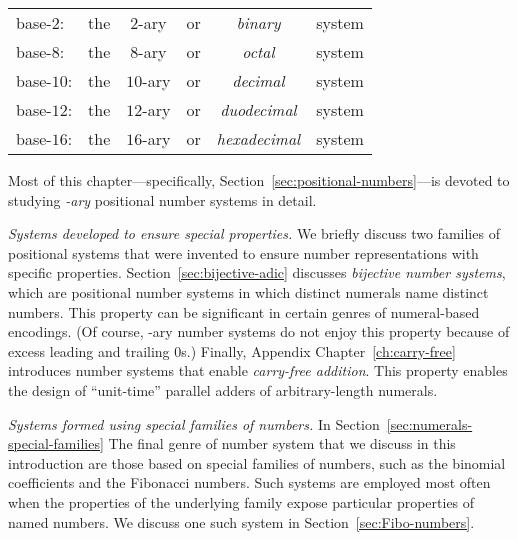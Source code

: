 \smallskip

\begin{tabular}{llclcl}
base-$2$:  & the & $2$-ary  & or & {\em binary}      & system \\
base-$8$:  & the & $8$-ary  & or & {\em octal}       & system \\
base-$10$: & the & $10$-ary & or & {\em decimal}     & system \\
base-$12$: & the & $12$-ary & or & {\em duodecimal}  & system \\
base-$16$: & the & $16$-ary & or & {\em hexadecimal} & system
\end{tabular}

\smallskip

\noindent
Most of this chapter---specifically,
Section~\ref{sec:positional-numbers}---is devoted to studying {\em
  -ary} positional number systems in detail.

\medskip

\noindent
{\it Systems developed to ensure special properties.}
We briefly discuss two families of positional systems that were
invented to ensure number representations with specific properties.
Section~\ref{sec:bijective-adic} discusses {\em bijective number
  systems}, 
which are positional number systems in which distinct numerals name
distinct numbers.  This property can be significant in certain genres
of numeral-based encodings.  (Of course, -ary number systems do not
enjoy this property because of excess leading and trailing $0$s.)
Finally, Appendix Chapter~\ref{ch:carry-free} introduces number
systems that enable {\em carry-free addition}.  This property enables
the design of ``unit-time'' parallel adders of arbitrary-length
numerals.

\medskip

\noindent
{\it Systems formed using special families of numbers.}
%
In Section~\ref{sec:numerals-special-families}
The final genre of number system that we discuss in this introduction
are those based on special families of numbers, such as the binomial
coefficients and the Fibonacci numbers.  Such systems are employed
most often when the properties of the underlying family expose
particular properties of named numbers.  We discuss one such system in
Section~\ref{sec:Fibo-numbers}.


